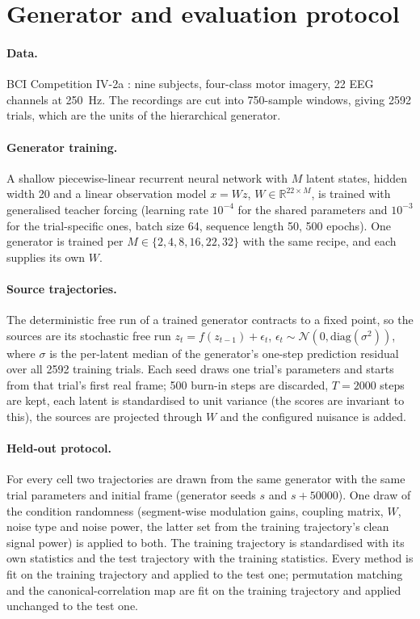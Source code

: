 \section{Generator and evaluation protocol}
\label{app:protocol}

\paragraph{Data.}
BCI Competition IV-2a \citep{brunner2008bci,tangermann2012review}: nine subjects, four-class motor imagery, 22 EEG channels at 250~Hz.
The recordings are cut into 750-sample windows, giving 2592 trials, which are the units of the hierarchical generator.

\paragraph{Generator training.}
A shallow piecewise-linear recurrent neural network \citep{brenner2024shPLRNN} with $M$ latent states, hidden width 20 and a linear observation model $x = Wz$, $W \in \mathbb{R}^{22 \times M}$, is trained with generalised teacher forcing \citep{hess2023gtf} (learning rate $10^{-4}$ for the shared parameters and $10^{-3}$ for the trial-specific ones, batch size 64, sequence length 50, 500 epochs).
One generator is trained per $M \in \{2, 4, 8, 16, 22, 32\}$ with the same recipe, and each supplies its own $W$.

\paragraph{Source trajectories.}
The deterministic free run of a trained generator contracts to a fixed point, so the sources are its stochastic free run $z_t = f(z_{t-1}) + \epsilon_t$, $\epsilon_t \sim \mathcal{N}(0, \mathrm{diag}(\sigma^2))$, where $\sigma$ is the per-latent median of the generator's one-step prediction residual over all 2592 training trials.
Each seed draws one trial's parameters and starts from that trial's first real frame; 500 burn-in steps are discarded, $T = 2000$ steps are kept, each latent is standardised to unit variance (the scores are invariant to this), the sources are projected through $W$ and the configured nuisance is added.

\paragraph{Held-out protocol.}
For every cell two trajectories are drawn from the same generator with the same trial parameters and initial frame (generator seeds $s$ and $s + 50000$).
One draw of the condition randomness (segment-wise modulation gains, coupling matrix, $W$, noise type and noise power, the latter set from the training trajectory's clean signal power) is applied to both.
The training trajectory is standardised with its own statistics and the test trajectory with the training statistics.
Every method is fit on the training trajectory and applied to the test one; permutation matching and the canonical-correlation map are fit on the training trajectory and applied unchanged to the test one.

